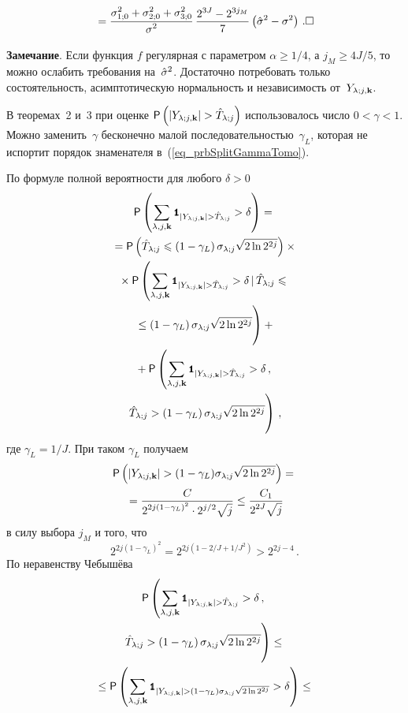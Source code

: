 \begin{multicols}{2}
\noindent
$$%
{}= \fr{  \silz^2 + \siilz^2 + \siiilz^2 }{ \sigma^2 }\, \fr{2^{3J}-2^{3j_M}}{7} \left(\hsig-\sigma^2\right)\,.\hfil\square
$$%

\medskip

\noindent
\textbf{Замечание}. 
Если функция $f$ регулярная с параметром $\alpha\geq 1/4$, а $j_M\geq 4J/5$, то можно ослабить требования 
на~$\hat\sigma^2$. Достаточно потребовать только состоятельность, асимптотическую нормальность и независимость от~$Y_{\lambda;j,\mathbf{k}}$.

\smallskip

В теоремах~2 и~3 при оценке ${\sf P}\left( |Y_{\lambda;j,\mathbf{k}}| > \hat T_{\lambda;j} \right)$ использовалось число $0<\gamma<1$. 
Можно заменить~$\gamma$ бесконечно малой последовательностью~$\gamma_L$, которая не испортит порядок знаменателя 
в~(\ref{eq_prbSplitGammaTomo}).

По формуле полной вероятности для любого $\delta>0$
\begin{multline}
\label{eq_sumOfIndicTomo}
\p\left( \sumljk\indYjkghTj > \delta \right) ={}\\
{}= \p\left( \hTlj \leqslant \left( 1-\gamma_L \right)\solj\sqrt{2\ln 2^{2j}} \right) \times{} \\
{}\times \p\left( \sumljk \indYjkghTj>\delta\,|\,\hTlj \leqslant{}\right.\\
\left.{}\vphantom{\sumljk\indYjkghTj}\leq \left(1-\gamma_L\right) \solj\sqrt{2\ln 2^{2j}} \right) +{} \\
{}+ \p\left(\sumljk\indYjkghTj>\delta\,,\right. \\
\left.\vphantom{\sumljk\indYjkghTj}\hTlj > \left( 1-\gamma_L \right) \solj\sqrt{2\ln 2^{2j}}\right)\,,
\end{multline}
где
$\gamma_L = 1/J$.
При таком $\gamma_L$ получаем
\begin{multline*}
{\sf P}\left( |Y_{\lambda;j,\mathbf{k}}| > (1-\gamma_L)\sigma_{\lambda;j}\sqrt{2\ln 2^{2j}} \right) = {}\\
{}=\displaystyle\frac{\displaystyle C\mathstrut}{\displaystyle  2^{2j(1-\gamma_L)^2}\cdot 2^{j/2}\sqrt{j} \mathstrut} \leq \displaystyle\frac{\displaystyle C_1\mathstrut}{\displaystyle  2^{2J} \sqrt{j} \mathstrut}
\end{multline*}
в силу выбора $j_M$ и того, что
\begin{equation*}
2^{2j\left(1-\gamma_L\right)^2} = 2^{2j\left( 1-2/J + 1/J^2 \right)} > 2^{2j-4}\,.
\end{equation*}
По неравенству Чебышёва
\begin{multline*}
\p\left(\sumljk\indYjkghTj>\delta\,, \right.\\
\left. \vphantom{\sumljk\indYjkghTj}\hTlj > \left( 1-\gamma_L \right) \solj\sqrt{2\ln 2^{2j}}\right) \leq{}\\
{}\leq \p\left( \sumljk \Ik_{ |\Yljk| > (1-\gamma_L)\solj\sqrt{2\ln 2^{2j}} } > \delta \right) \leq{}
\end{multline*}


\end{multicols}
